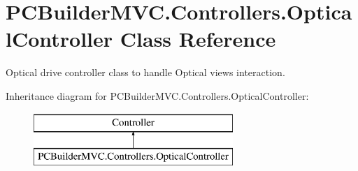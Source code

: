 \hypertarget{class_p_c_builder_m_v_c_1_1_controllers_1_1_optical_controller}{}\section{P\+C\+Builder\+M\+V\+C.\+Controllers.\+Optical\+Controller Class Reference}
\label{class_p_c_builder_m_v_c_1_1_controllers_1_1_optical_controller}


Optical drive controller class to handle Optical views interaction.  


Inheritance diagram for P\+C\+Builder\+M\+V\+C.\+Controllers.\+Optical\+Controller\+:\begin{figure}[H]
\begin{center}
\leavevmode
\includegraphics[height=2.000000cm]{class_p_c_builder_m_v_c_1_1_controllers_1_1_optical_controller}
\end{center}
\end{figure}
